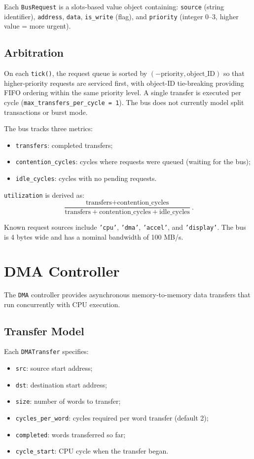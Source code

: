 \documentclass[10pt,a4paper,twoside]{book}
\begin{document}
Each \texttt{BusRequest} is a slots-based value object containing:
\texttt{source} (string identifier), \texttt{address}, \texttt{data},
\texttt{is\_write} (flag), and \texttt{priority} (integer 0--3, higher value
= more urgent).

\subsection{Arbitration}

On each \texttt{tick()}, the request queue is sorted by
$(-\text{priority}, \text{object\_ID})$ so that higher-priority requests
are serviced first, with object-ID tie-breaking providing FIFO ordering
within the same priority level. A single transfer is executed per cycle
(\texttt{max\_transfers\_per\_cycle = 1}). The bus does not currently model
split transactions or burst mode.

The bus tracks three metrics:
\begin{itemize}
    \item \texttt{transfers}: completed transfers;
    \item \texttt{contention\_cycles}: cycles where requests were queued
          (waiting for the bus);
    \item \texttt{idle\_cycles}: cycles with no pending requests.
\end{itemize}

\noindent\texttt{utilization} is derived as:
\[
\frac{\text{transfers} + \text{contention\_cycles}}{\text{transfers} + \text{contention\_cycles} + \text{idle\_cycles}}.
\]

Known request sources include \texttt{'cpu'}, \texttt{'dma'},
\texttt{'accel'}, and \texttt{'display'}. The bus is 4 bytes wide and
has a nominal bandwidth of 100 MB/s.

\section{DMA Controller}

The \texttt{DMA} controller provides asynchronous memory-to-memory data
transfers that run concurrently with CPU execution.

\subsection{Transfer Model}

Each \texttt{DMATransfer} specifies:
\begin{itemize}
    \item \texttt{src}: source start address;
    \item \texttt{dst}: destination start address;
    \item \texttt{size}: number of words to transfer;
    \item \texttt{cycles\_per\_word}: cycles required per word transfer
          (default 2);
    \item \texttt{completed}: words transferred so far;
    \item \texttt{cycle\_start}: CPU cycle when the transfer began.
\end{itemize}
\end{document}
